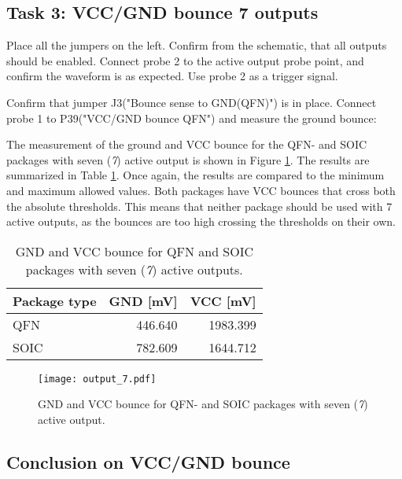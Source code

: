 \documentclass[../main.tex]{subfiles}
\begin{document}
\subsection{Task 3: VCC/GND bounce 7 outputs}

Place all the jumpers on the left. Confirm from the schematic, that all outputs should be enabled. Connect probe 2 to the active output probe point, and confirm the waveform is as expected. Use probe 2 as a trigger signal.

\vspace{10pt}
Confirm that jumper J3("Bounce sense to GND(QFN)") is in place. Connect probe 1 to P39("VCC/GND bounce QFN") and measure the ground bounce:

\solution

The measurement of the ground and VCC bounce for the QFN- and SOIC packages with seven (\textit{7}) active output is shown in Figure \ref{fig:gnd_vcc_output_7}. The results are summarized in Table \ref{tab:output_7}. Once again, the results are compared to the minimum and maximum allowed values. Both packages have VCC bounces that cross both the absolute thresholds. This means that neither package should be used with 7 active outputs, as the bounces are too high crossing the thresholds on their own.

\begin{table}[h]
    \centering
    \begin{tabular}{l | r r}
        \toprule[1pt]
        Package type    & GND [mV]  & VCC [mV]\\
        \midrule
        QFN             & 446.640   & 1983.399  \\
        SOIC            & 782.609   & 1644.712  \\
        \bottomrule[1pt]
    \end{tabular}
    \caption{GND and VCC bounce for QFN and SOIC packages with seven (\textit{7}) active outputs.}
    \label{tab:output_7}
\end{table}

\newpage

\begin{figure}[h]
    \centering
    \texttt{[image: output\_7.pdf]}
    \caption{GND and VCC bounce for QFN- and SOIC packages with seven (\textit{7}) active output.}
    \label{fig:gnd_vcc_output_7}
\end{figure}

\subsection{Conclusion on VCC/GND bounce}
\end{document}
